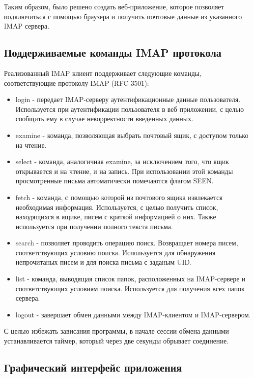 \documentclass[a4paper,14pt]{extarticle}
\begin{document}
Таким образом, было решено создать веб-приложение, которое позволяет подключиться с помощью браузера
и получить почтовые данные из указанного IMAP сервера.

\subsection{Поддерживаемые команды IMAP протокола}
Реализованный IMAP клиент поддерживает следующие команды, соответствующие протоколу IMAP (RFC 3501):

\begin{itemize}
    \item login - передает IMAP-серверу аутентификационные данные пользователя.
    Используется при аутентификации пользователя в веб приложении,
    с целью сообщить ему в случае некорректности введенных данных.
    \item examine - команда, позволяющая выбрать почтовый ящик, с доступом только на чтение.
    \item select - команда, аналогичная examine, за исключением того, что ящик открывается и на чтение, и на запись.
    При использовании этой команды просмотренные письма автоматически помечаются флагом SEEN.
    \item fetch - команда, с помощью которой из почтового ящика извлекается необходимая информация.
    Используется, с целью  получить список, находящихся в ящике, писем с краткой информацией о них.
    Также  используется при получении полного текста письма.
    \item search - позволяет проводить операцию поиск. Возвращает номера писем, соответствующих условию поиска.
    Используется для обнаружения непрочитаных писем и для поиска письма с заданым UID.
    \item list - команда, выводящая список папок, расположенных на IMAP-сервере и соответствующих условиям поиска.
    Используется для получения всех папок сервера.
    \item logout - завершает обмен данными между IMAP-клиентом и IMAP-сервером.
\end{itemize}

С целью избежать зависания программы, в начале сессии обмена данными устанавливается таймер,
который через две секунды обрывает соединение.

\subsection{Графический интерфейс приложения}
\end{document}
